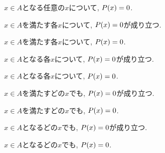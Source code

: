 \item $x\in A$となる任意の$x$について, $P(x)=0$.
\item $x\in A$を満たす各$x$について, $P(x)=0$が成り立つ.
\item $x\in A$を満たす各$x$について, $P(x)=0$.
\item $x\in A$となる各$x$について, $P(x)=0$が成り立つ.
\item $x\in A$となる各$x$について, $P(x)=0$.
\item $x\in A$を満たすどの$x$でも, $P(x)=0$が成り立つ.
\item $x\in A$を満たすどの$x$でも, $P(x)=0$.
\item $x\in A$となるどの$x$でも, $P(x)=0$が成り立つ.
\item $x\in A$となるどの$x$でも, $P(x)=0$.
